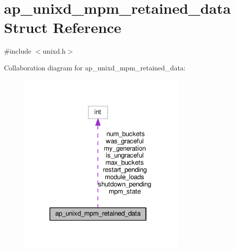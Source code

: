 \hypertarget{structap__unixd__mpm__retained__data}{}\section{ap\+\_\+unixd\+\_\+mpm\+\_\+retained\+\_\+data Struct Reference}
\label{structap__unixd__mpm__retained__data}


{\ttfamily \#include $<$unixd.\+h$>$}



Collaboration diagram for ap\+\_\+unixd\+\_\+mpm\+\_\+retained\+\_\+data\+:
\nopagebreak
\begin{figure}[H]
\begin{center}
\leavevmode
\includegraphics[width=235pt]{structap__unixd__mpm__retained__data__coll__graph}
\end{center}
\end{figure}
